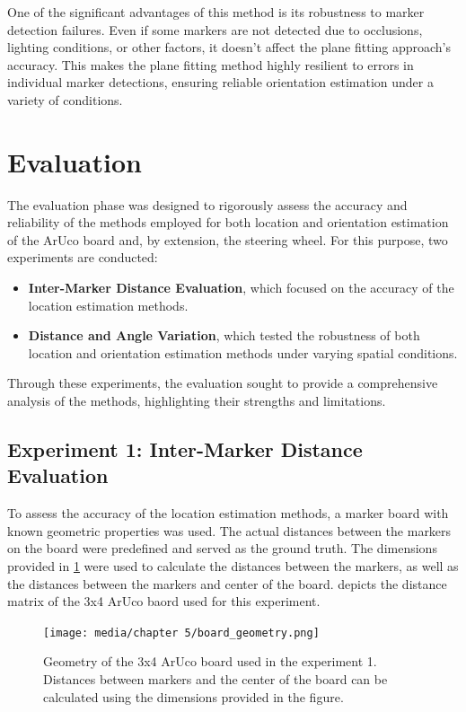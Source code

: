 One of the significant advantages of this method is its 
robustness to marker detection failures. Even if some markers 
are not detected due to occlusions, lighting conditions, or 
other factors, it doesn't affect the plane fitting approach's accuracy. This makes the plane fitting method highly 
resilient to errors in individual marker detections, ensuring 
reliable orientation estimation under a variety of conditions.



\section{Evaluation}
The evaluation phase was designed to rigorously assess the accuracy 
and reliability of the methods employed for both location and 
orientation estimation of the ArUco board and, by extension, the 
steering wheel. For this purpose, two experiments are conducted:
\begin{itemize}
    \item \textbf{Inter-Marker Distance Evaluation}, which focused on the 
    accuracy of the location estimation methods.
    \item \textbf{Distance and Angle Variation}, which tested the robustness 
    of both location and orientation estimation methods under varying 
    spatial conditions.
\end{itemize}

Through these experiments, the evaluation sought to provide a 
comprehensive analysis of the methods, highlighting their strengths 
and limitations.

\subsection{Experiment 1: Inter-Marker Distance Evaluation}
To assess the accuracy of the location estimation methods, a marker board with known geometric properties was used. The actual distances between the markers on the board were predefined and served as the ground truth. The dimensions provided in \cref{fig:marker_dimention} were used to calculate the distances between the markers, as well as the distances between the markers and center of the board.  depicts the distance matrix of the 3x4 ArUco baord used for this experiment.

\begin{figure}[htpb]
    \centering
    \texttt{[image: media/chapter 5/board\_geometry.png]}
    \caption{Geometry of the 3x4 ArUco board used in the experiment 1. Distances between markers and the center of the board can be calculated using the dimensions provided in the figure.}
    \label{fig:marker_dimention}
\end{figure}

